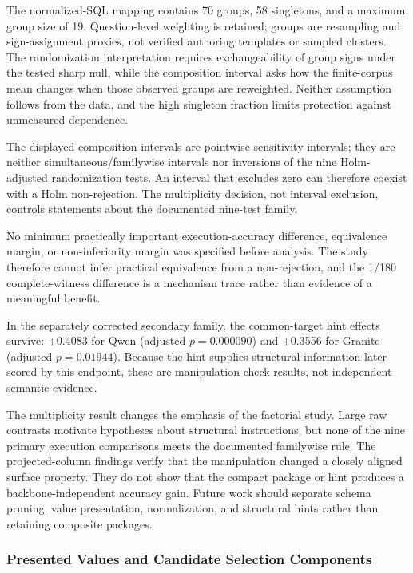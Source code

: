 \documentclass[information,article,submit,moreauthors]{Definitions/mdpi}
\begin{document}
The normalized-SQL mapping contains 70 groups, 58 singletons, and a maximum group size of 19. Question-level weighting is retained; groups are resampling and sign-assignment proxies, not verified authoring templates or sampled clusters. The randomization interpretation requires exchangeability of group signs under the tested sharp null, while the composition interval asks how the finite-corpus mean changes when those observed groups are reweighted. Neither assumption follows from the data, and the high singleton fraction limits protection against unmeasured dependence.

The displayed composition intervals are pointwise sensitivity intervals; they are neither simultaneous/familywise intervals nor inversions of the nine Holm-adjusted randomization tests. An interval that excludes zero can therefore coexist with a Holm non-rejection. The multiplicity decision, not interval exclusion, controls statements about the documented nine-test family.

No minimum practically important execution-accuracy difference, equivalence margin, or non-inferiority margin was specified before analysis. The study therefore cannot infer practical equivalence from a non-rejection, and the 1/180 complete-witness difference is a mechanism trace rather than evidence of a meaningful benefit.

In the separately corrected secondary family, the common-target hint effects survive: +0.4083 for Qwen (adjusted $p=0.000090$) and +0.3556 for Granite (adjusted $p=0.01944$). Because the hint supplies structural information later scored by this endpoint, these are manipulation-check results, not independent semantic evidence.

The multiplicity result changes the emphasis of the factorial study. Large raw contrasts motivate hypotheses about structural instructions, but none of the nine primary execution comparisons meets the documented familywise rule. The projected-column findings verify that the manipulation changed a closely aligned surface property. They do not show that the compact package or hint produces a backbone-independent accuracy gain. Future work should separate schema pruning, value presentation, normalization, and structural hints rather than retaining composite packages.

\subsubsection{Presented Values and Candidate Selection Components}
\end{document}
